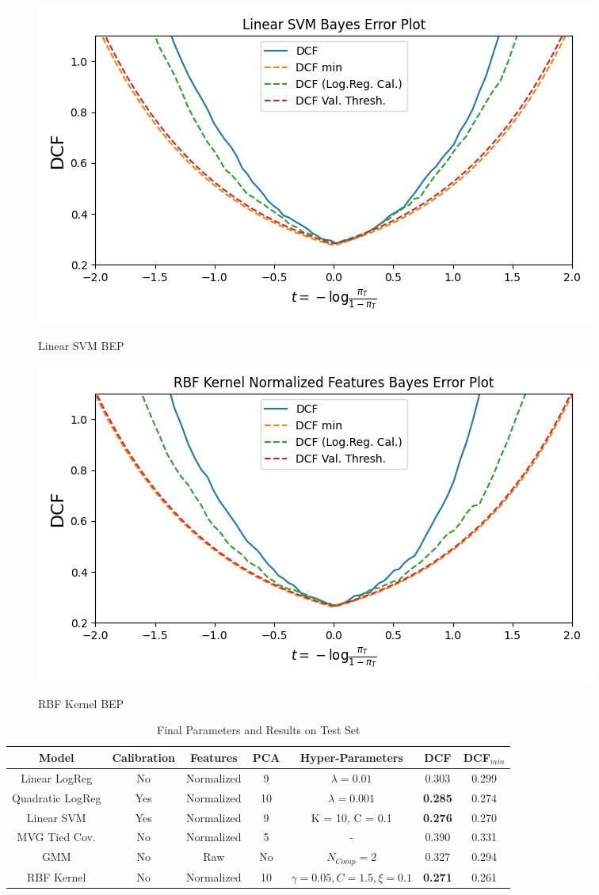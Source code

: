 \documentclass[hidelinks, 12pt, twocolumn]{article}
\begin{document}
\begin{figure}[H] 
    {\includegraphics[width=\linewidth]{linsvmBEP.jpg}}
    \caption{Linear SVM BEP}
    \label{fig:linsvmbep}
\end{figure}

\begin{figure}[H] 
    {\includegraphics[width=\linewidth]{RBFNormalizedBEP.jpg}}
    \caption{RBF Kernel BEP}
    \label{fig:rbfkernelbep}
\end{figure}

\begin{table}[t] 
    \centering
    \begin{tabular}{||c|c|c|c|c|c|c||}
        \hline 
        Model & Calibration & Features & PCA & Hyper-Parameters & DCF & DCF$_{min}$ \\
        \hline
        Linear LogReg & No & Normalized & 9 & $\lambda = 0.01$ & 0.303 & 0.299 \\
        Quadratic LogReg & Yes & Normalized & 10 & $\lambda = 0.001$ & {\bf 0.285} & 0.274 \\
        Linear SVM & Yes & Normalized & 9 & K = 10, C = 0.1 & {\bf 0.276} & 0.270 \\
        MVG Tied Cov. & No & Normalized & 5 & - & 0.390 & 0.331 \\
        GMM & No & Raw & No & $N_{Comp} = 2 $ & 0.327 & 0.294 \\ 
        RBF Kernel & No & Normalized & 10 & $\gamma = 0.05, C = 1.5, \xi = 0.1$  & {\bf 0.271} & 0.261 \\
        \hline
    \end{tabular}
    \caption{Final Parameters and Results on Test Set}
\end{table}
\end{document}
